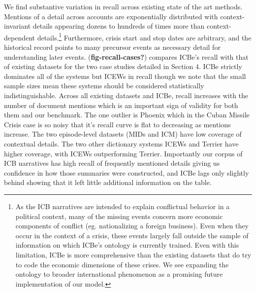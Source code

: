 \documentclass{article}
\begin{document}
We find substantive variation in recall across existing state of the art
methods. Mentions of a detail across accounts are exponentially
distributed with context-invariant details appearing dozens to hundreds
of times more than context-dependent details.\footnote{As the ICB
  narratives are intended to explain conflictual behavior in a political
  context, many of the missing events concern more economic components
  of conflict (eg. nationalizing a foreign business). Even when they
  occur in the context of a crisis, these events largely fall outside
  the sample of information on which ICBe's ontology is currently
  trained. Even with this limitation, ICBe is more comprehensive than
  the existing datasets that do try to code the economic dimensions of
  these crises. We see expanding the ontology to broader international
  phenomenon as a promising future implementation of our model.}
Furthermore, crisis start and stop dates are arbitrary, and the
historical record points to many precursor events as necessary detail
for understanding later events. (\textbf{fig-recall-cases?}) compares
ICBe's recall with that of existing datasets for the two case studies
detailed in Section 4. ICBe strictly dominates all of the systems but
ICEWs in recall though we note that the small sample sizes mean these
systems should be considered statistically indistinguishable. Across all
existing datasets and ICBe, recall increases with the number of document
mentions which is an important sign of validity for both them and our
benchmark. The one outlier is Phoenix which in the Cuban Missile Crisis
case is so noisy that it's recall curve is flat to decreasing as
mentions increase. The two episode-level datasets (MIDs and ICM) have
low coverage of contextual details. The two other dictionary systems
ICEWs and Terrier have higher coverage, with ICEWs outperforming
Terrier. Importantly our corpus of ICB narratives has high recall of
frequently mentioned details giving us confidence in how those summaries
were constructed, and ICBe lags only slightly behind showing that it
left little additional information on the table.
\end{document}
